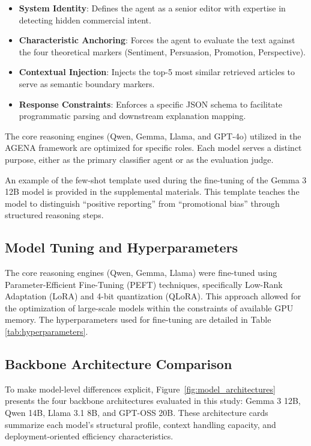 \documentclass{ieeeaccess}
\begin{document}
\begin{itemize}
    \item \textbf{System Identity}: Defines the agent as a senior editor with expertise in detecting hidden commercial intent.
    \item \textbf{Characteristic Anchoring}: Forces the agent to evaluate the text against the four theoretical markers (Sentiment, Persuasion, Promotion, Perspective).
    \item \textbf{Contextual Injection}: Injects the top-5 most similar retrieved articles to serve as semantic boundary markers.
    \item \textbf{Response Constraints}: Enforces a specific JSON schema to facilitate programmatic parsing and downstream explanation mapping.
\end{itemize}

The core reasoning engines (Qwen, Gemma, Llama, and GPT-4o) utilized in the AGENA framework are optimized for specific roles. Each model serves a distinct purpose, either as the primary classifier agent or as the evaluation judge.


An example of the few-shot template used during the fine-tuning of the Gemma 3 12B model is provided in the supplemental materials. This template teaches the model to distinguish ``positive reporting'' from ``promotional bias'' through structured reasoning steps.

\subsection{Model Tuning and Hyperparameters}
The core reasoning engines (Qwen, Gemma, Llama) were fine-tuned using Parameter-Efficient Fine-Tuning (PEFT) techniques, specifically Low-Rank Adaptation (LoRA) and 4-bit quantization (QLoRA). This approach allowed for the optimization of large-scale models within the constraints of available GPU memory. The hyperparameters used for fine-tuning are detailed in Table \ref{tab:hyperparameters}.

\subsection{Backbone Architecture Comparison}
To make model-level differences explicit, Figure~\ref{fig:model_architectures} presents the four backbone architectures evaluated in this study: Gemma 3 12B, Qwen 14B, Llama 3.1 8B, and GPT-OSS 20B. These architecture cards summarize each model's structural profile, context handling capacity, and deployment-oriented efficiency characteristics.
\end{document}
